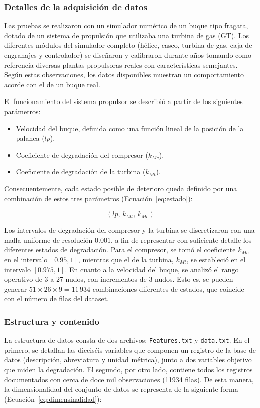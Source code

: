 \documentclass[a4paper]{article}
\begin{document}
  \subsubsection{Detalles de la adquisición de datos}
    Las pruebas se realizaron con un simulador numérico de un buque tipo fragata, dotado de un sistema de propulsión que utilizaba una turbina de gas (GT). Los diferentes módulos del simulador completo (hélice, casco, turbina de gas, caja de engranajes y controlador) se diseñaron y calibraron durante años tomando como referencia diversas plantas propulsoras reales con características semejantes. Según estas observaciones, los datos disponibles muestran un comportamiento acorde con el de un buque real.~\cite{condition_based_maintenance_of_naval_propulsion_plants_316}

    El funcionamiento del sistema propulsor se describió a partir de los siguientes parámetros:
    \begin{itemize}
      \item Velocidad del buque, definida como una función lineal de la posición de la palanca ($lp$).
      \item Coeficiente de degradación del compresor ($k_{Mc}$).
      \item Coeficiente de degradación de la turbina ($k_{Mt}$).
    \end{itemize}

    Consecuentemente, cada estado posible de deterioro queda definido por una combinación de estos tres parámetros (Ecuación~\ref{eq:estado}):

    \begin{equation}
      \label{eq:estado}
      (lp, \, k_{Mt}, \, k_{Mc})
    \end{equation}

    Los intervalos de degradación del compresor y la turbina se discretizaron con una malla uniforme de resolución $0. 001$, a fin de representar con suficiente detalle los diferentes estados de degradación. Para el compresor, se tomó el coeficiente $k_{Mc}$ en el intervalo $[0. 95, 1]$, mientras que el de la turbina, $k_{Mt}$, se estableció en el intervalo $[0. 975, 1]$. En cuanto a la velocidad del buque, se analizó el rango operativo de $3$ a $27$ nudos, con incrementos de $3$ nudos. Esto es, se pueden generar $51 \times 26 \times 9 = 11 \, 934$ combinaciones diferentes de estados, que coincide con el número de filas del dataset.
    
  \subsubsection{Estructura y contenido}
  \label{sec:estructura-contenido}
    La estructura de datos consta de dos archivos:  \texttt{Features.txt} y \texttt{data.txt}. En el primero, se detallan las dieciséis variables que componen un registro de la base de datos (descripción, abreviatura y unidad métrica), junto a dos variables objetivo que miden la degradación. El segundo, por otro lado, contiene todos los registros documentados con cerca de doce mil observaciones (11934 filas). De esta manera, la dimensionalidad del conjunto de datos se representa de la siguiente forma (Ecuación~\ref{eq:dimensinalidad}):
\end{document}
